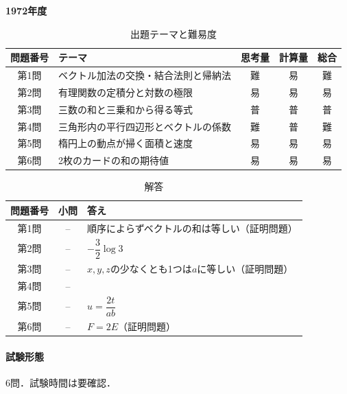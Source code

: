 \documentclass[../../main.tex]{subfiles}
\begin{document}
\begin{center}
  {\fontsize{48pt}{58pt}\selectfont \textbf{1972}\normalsize\textbf{年度}}
\end{center}

\begin{table}[htb]
  \centering
  \caption{出題テーマと難易度}
  \begin{tabular}{|c|p{6.2cm}|c|c|c|}
    \hline
    \textbf{問題番号} & \textbf{テーマ} & \textbf{思考量} & \textbf{計算量} & \textbf{総合} \\
    \hline
    第1問 & ベクトル加法の交換・結合法則と帰納法 & 難 & 易 & 難 \\
    \hline
    第2問 & 有理関数の定積分と対数の極限 & 易 & 易 & 易 \\
    \hline
    第3問 & 三数の和と三乗和から得る等式 & 普 & 普 & 普 \\
    \hline
    第4問 & 三角形内の平行四辺形とベクトルの係数 & 難 & 普 & 難 \\
    \hline
    第5問 & 楕円上の動点が掃く面積と速度 & 易 & 易 & 易 \\
    \hline
    第6問 & 2枚のカードの和の期待値 & 易 & 易 & 易 \\
    \hline
  \end{tabular}
\end{table}

\begin{table}[htb]
  \centering
  \caption{解答}
  \renewcommand{\arraystretch}{1.4}
  \begin{tabular}{|c|c|p{9cm}|}
    \hline
    \textbf{問題番号} & \textbf{小問} & \textbf{答え} \\
    \hline
    第1問 & -- & 順序によらずベクトルの和は等しい（証明問題） \\
    \hline
    第2問 & -- & $-\dfrac{3}{2}\log 3$ \\
    \hline
    第3問 & -- & $x,y,z$の少なくとも1つは$a$に等しい（証明問題） \\
    \hline
    第4問 & -- &  \\
    \hline
    第5問 & -- & $u=\dfrac{2t}{ab}$ \\
    \hline
    第6問 & -- & $F=2E$（証明問題） \\
    \hline
  \end{tabular}
\end{table}

\paragraph{試験形態}
6問．試験時間は要確認．
\end{document}
